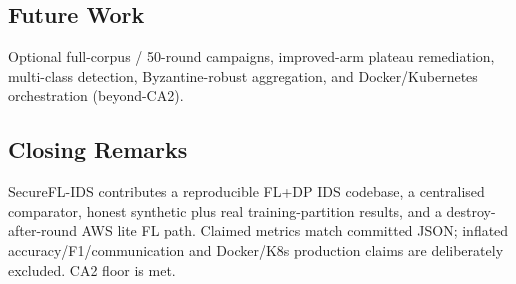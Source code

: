 \subsection{Future Work}

Optional full-corpus / 50-round campaigns, improved-arm plateau remediation, multi-class detection, Byzantine-robust aggregation, and Docker/Kubernetes orchestration (beyond-CA2).

\subsection{Closing Remarks}

SecureFL-IDS contributes a reproducible FL+DP IDS codebase, a centralised comparator, honest synthetic plus real training-partition results, and a destroy-after-round AWS lite FL path. Claimed metrics match committed JSON; inflated accuracy/F1/communication and Docker/K8s production claims are deliberately excluded. CA2 floor is met.
